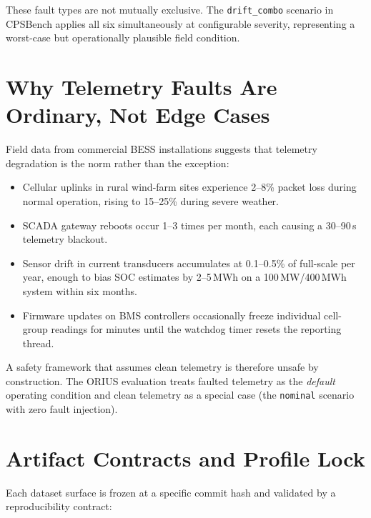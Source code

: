 These fault types are not mutually exclusive.  The \texttt{drift\_combo}
scenario in CPSBench applies all six simultaneously at configurable severity,
representing a worst-case but operationally plausible field condition.

\section{Why Telemetry Faults Are Ordinary, Not Edge Cases}

Field data from commercial BESS installations suggests that telemetry
degradation is the norm rather than the exception:

\begin{itemize}
  \item Cellular uplinks in rural wind-farm sites experience 2--8\% packet
    loss during normal operation, rising to 15--25\% during severe weather.
  \item SCADA gateway reboots occur 1--3 times per month, each causing a
    30--90\,s telemetry blackout.
  \item Sensor drift in current transducers accumulates at 0.1--0.5\% of
    full-scale per year, enough to bias SOC estimates by 2--5\,MWh on a
    100\,MW/400\,MWh system within six months.
  \item Firmware updates on BMS controllers occasionally freeze individual
    cell-group readings for minutes until the watchdog timer resets the
    reporting thread.
\end{itemize}

A safety framework that assumes clean telemetry is therefore unsafe by
construction.  The ORIUS evaluation treats faulted telemetry as the
\emph{default} operating condition and clean telemetry as a special case
(the \texttt{nominal} scenario with zero fault injection).

\section{Artifact Contracts and Profile Lock}

Each dataset surface is frozen at a specific commit hash and validated by a
reproducibility contract:

